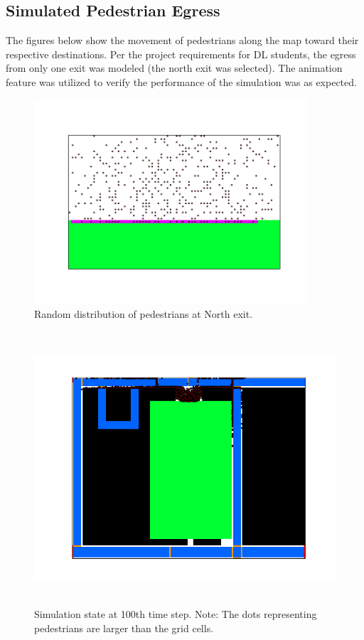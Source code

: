 \documentclass[paper=a4, fontsize=11pt]{scrartcl}
\numberwithin{equation}{section}		%
\numberwithin{figure}{section}			%
\numberwithin{table}{section}		    %
\begin{document}
\subsection{Simulated Pedestrian Egress}
The figures below show the movement of pedestrians along the map toward their respective 
destinations. Per the project requirements for DL students, the egress from only one exit was 
modeled (the north exit was selected). The animation feature was utilized to verify the performance 
of the simulation was as expected.

\begin{figure}[H]
	\begin{center} 
		\includegraphics[height=3in,width=4in]{north_exit_zoomed} 
		\caption{Random distribution of pedestrians at North exit.\label{fig:exit_zoomed}}
	\end{center} 
\end{figure}

\begin{figure}[H]
	\begin{center}
		\includegraphics[height=4in,width=5.5in]{sim_100} 
		\caption{Simulation state at 100th time step. Note: The dots representing pedestrians are 
		larger than the grid cells.\label{fig:sim_100}}
	\end{center} 
\end{figure}
\end{document}
